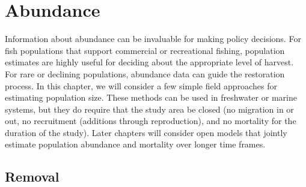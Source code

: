 \documentclass[
]{krantz}
\begin{document}

\hypertarget{Abundance}{%
\chapter{Abundance}\label{Abundance}}

Information about abundance can be invaluable for making policy decisions. For fish populations that support commercial or recreational fishing, population estimates are highly useful for deciding about the appropriate level of harvest. For rare or declining populations, abundance data can guide the restoration process. In this chapter, we will consider a few simple field approaches for estimating population size. These methods can be used in freshwater or marine systems, but they do require that the study area be closed (no migration in or out, no recruitment (additions through reproduction), and no mortality for the duration of the study). Later chapters will consider open models that jointly estimate population abundance and mortality over longer time frames.

\hypertarget{removal}{%
\section{Removal}\label{removal}}
\end{document}
